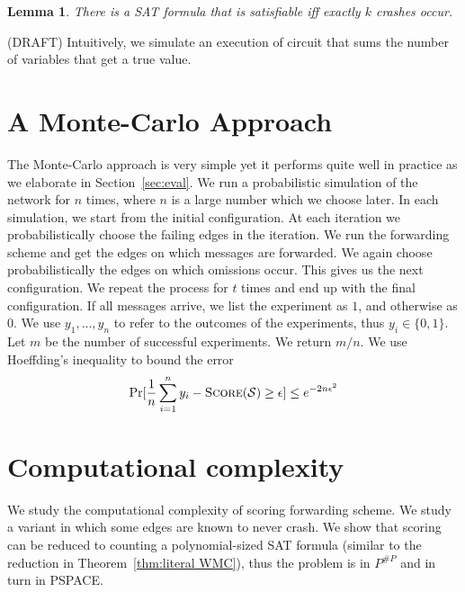 \documentclass[11pt,eepic]{article}
\newcommand{\set}[1]{\{ #1  \}}
\renewcommand{\S}{{\cal S}}
\newcommand{\score}{\mbox{\sc Score}}
\newtheorem{lemma}[theorem]{Lemma}
\def\eod{\vrule height 6pt width 5pt depth 0pt}
\newenvironment{proof}{\noindent {\bf Proof:} \hspace{.677em}}
	                      {\hspace*{\fill}{\eod}}
\begin{document}
		\begin{lemma}
		\label{lem:k crash sat}
		There is a SAT formula that is satisfiable iff exactly $k$ crashes occur.
		\end{lemma}
		\begin{proof}
		(DRAFT) Intuitively, we simulate an execution of circuit that sums the number of variables that get a true value.
		\end{proof}




\section{A Monte-Carlo Approach}
\label{sec:monte-carlo}
	The Monte-Carlo approach is very simple yet it performs quite well in practice as we elaborate in Section~\ref{sec:eval}. We run a probabilistic simulation of the network for $n$ times, where $n$ is a large number which we choose later. In each simulation, we start from the initial configuration. At each iteration we probabilistically choose the failing edges in the iteration. We run the forwarding scheme and get the edges on which messages are forwarded. We again choose probabilistically the edges on which omissions occur. This gives us the next configuration. We repeat the process for $t$ times and end up with the final configuration. If all messages arrive, we list the experiment as $1$, and otherwise as $0$. We use $y_1, \ldots, y_n$ to refer to the outcomes of the experiments, thus $y_i \in \set{0,1}$. Let $m$ be the number of successful experiments. We return $m/n$. We use Hoeffding's inequality to bound the error \[\Pr[\frac{1}{n}\sum_{i=1}^n y_i - \score(\S) \geq \epsilon] \leq e^{-2n\epsilon^2}\]





\section{Computational complexity}
	We study the computational complexity of scoring forwarding scheme. We study a variant in which some edges are known to never crash. We show that scoring can be reduced to counting a polynomial-sized SAT formula (similar to the reduction in Theorem~\ref{thm:literal WMC}), thus the problem is in $P^{\#P}$ and in turn in PSPACE. 
\end{document}
